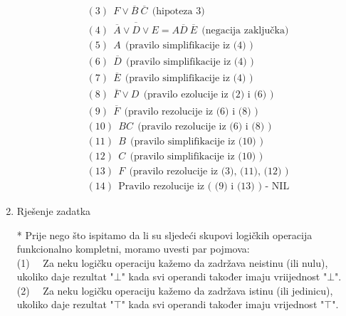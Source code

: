 \documentclass[12pt]{article}
\begin{document}
\begin{enumerate}
\begin{align*}
		    (3)~~ F \vee \overline{B}~\overline{C} ~~ \text{(hipoteza 3)} \\
		    
		    (4)~~ \overline{\overline{A} \vee D \vee E} = A\overline{D}~\overline{E} ~~ \text{(negacija zaključka)} \\
		    
		    (5)~~ A ~~\text{(pravilo simplifikacije iz (4)~)} \\
		    
		    (6)~~ \overline{D} ~~\text{(pravilo simplifikacije iz (4)~)} \\
		    
		    (7)~~ \overline{E} ~~\text{(pravilo simplifikacije iz (4)~)} \\
		    
		    (8)~~ \overline{F} \vee D ~~ \text{(pravilo ezolucije iz (2) i (6)~)} \\
		    
		    (9)~~ \overline{F} ~~  \text{(pravilo rezolucije iz (6) i (8)~)} \\
		    
		    (10)~~ BC ~~ \text{(pravilo rezolucije iz (6) i (8)~)} \\
		    
		    (11)~~ B ~~ \text{(pravilo simplifikacije iz (10)~)} \\
		    
		    (12)~~ C ~~ \text{(pravilo simplifikacije iz (10)~)} \\
		    
		    (13)~~ F ~~ \text{(pravilo rezolucije iz (3), (11), (12)~)} \\
		    
		    (14)~~ \text{Pravilo~rezolucije~iz~(~(9)~i~(13)~)~-~NIL}
 		\end{align*}
		\newpage
		\item Rješenje zadatka
		
		* Prije nego što ispitamo da li su sljedeći skupovi logičkih operacija funkcionalno
          kompletni, moramo uvesti par pojmova: \\

		  (1)~~ Za neku logičku operaciju kažemo da zadržava neistinu (ili nulu), ukoliko daje rezultat "{$\bot$}" kada svi operandi također imaju vriijednost "{$\bot$}". \\
		  
		  (2)~~ Za neku logičku operaciju kažemo da zadržava istinu (ili jedinicu), ukoliko daje rezultat "{$\top$}" kada svi operandi također imaju vrijednost "{$\top$}". \\
		  

\end{enumerate}
\end{document}
